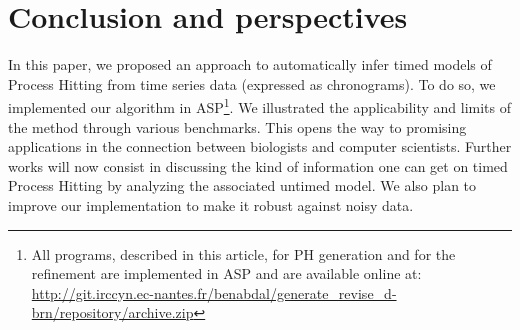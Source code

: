 \section{Conclusion and perspectives}
\label{sec:conclusion}

In this paper, we proposed an approach to automatically infer timed models of Process Hitting from time series data (expressed as chronograms). To do so, we implemented our algorithm in ASP\footnote{All programs, described in this article, for PH generation and for the refinement are implemented in ASP and are available online at: \url{http://git.irccyn.ec-nantes.fr/benabdal/generate_revise_d-brn/repository/archive.zip}}. We illustrated the applicability and limits of the method through various benchmarks. This opens the way to promising applications in the connection between biologists and computer scientists. Further works will now consist in discussing the kind of information one can get on timed Process Hitting by analyzing the associated untimed model. We also plan to improve our implementation to make it robust against noisy data.  
